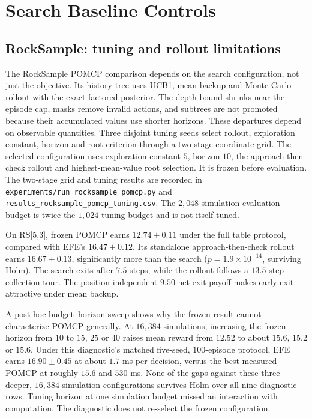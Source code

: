 \documentclass[manuscript, screen, review]{jair}
\begin{document}
\FloatBarrier

\section{Search Baseline Controls}

\subsection{RockSample: tuning and rollout limitations}
\label{app:rocksample}

The RockSample POMCP comparison depends on the search configuration, not just the objective. Its history tree uses UCB1, mean backup and Monte Carlo rollout with the exact factored posterior. The depth bound shrinks near the episode cap, masks remove invalid actions, and subtrees are not promoted because their accumulated values use shorter horizons. These departures depend on observable quantities. Three disjoint tuning seeds select rollout, exploration constant, horizon and root criterion through a two-stage coordinate grid. The selected configuration uses exploration constant $5$, horizon $10$, the approach-then-check rollout and highest-mean-value root selection. It is frozen before evaluation. The two-stage grid and tuning results are recorded in \texttt{experiments/\allowbreak run\_\allowbreak rocksample\_\allowbreak pomcp.py} and \texttt{results\_\allowbreak rocksample\_\allowbreak pomcp\_\allowbreak tuning.csv}. The $2{,}048$-simulation evaluation budget is twice the $1{,}024$ tuning budget and is not itself tuned.

On RS[5,3], frozen POMCP earns $12.74\pm0.11$ under the full table protocol, compared with EFE's $16.47\pm0.12$. Its standalone approach-then-check rollout earns $16.67\pm0.13$, significantly more than the search ($p=1.9\times10^{-14}$, surviving Holm). The search exits after $7.5$ steps, while the rollout follows a $13.5$-step collection tour. The position-independent $9.50$ net exit payoff makes early exit attractive under mean backup.

A post hoc budget--horizon sweep shows why the frozen result cannot characterize POMCP generally. At $16{,}384$ simulations, increasing the frozen horizon from $10$ to $15$, $25$ or $40$ raises mean reward from $12.52$ to about $15.6$, $15.2$ or $15.6$. Under this diagnostic's matched five-seed, $100$-episode protocol, EFE earns $16.90\pm0.45$ at about $1.7$ ms per decision, versus the best measured POMCP at roughly $15.6$ and $530$ ms. None of the gaps against these three deeper, $16{,}384$-simulation configurations survives Holm over all nine diagnostic rows. Tuning horizon at one simulation budget missed an interaction with computation. The diagnostic does not re-select the frozen configuration.
\end{document}
